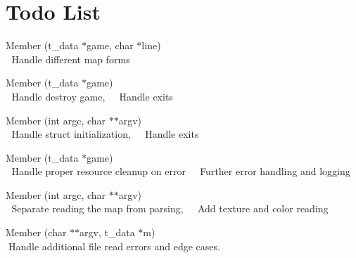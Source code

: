 \chapter{Todo List}
\hypertarget{todo}{}\label{todo}

\begin{DoxyRefList}
\item[Member \doxylink{read__map_8c_a804cd515bd4c1bf7169adeb352db80fb}{add\+\_\+line} (t\+\_\+data \texorpdfstring{$\ast$}{*}game, char \texorpdfstring{$\ast$}{*}line)]\hfill \\
\label{todo__todo000004}%
%
👾 Handle different map forms  
\item[Member \doxylink{cub3d_8c_a935bbae1ea2cb5d18534db1274ec24dd}{exit\+\_\+point} (t\+\_\+data \texorpdfstring{$\ast$}{*}game)]\hfill \\
\label{todo__todo000001}%
%
👾 Handle destroy game,~\newline
 👾 Handle exits  
\item[Member \doxylink{cub3d_8c_a3c04138a5bfe5d72780bb7e82a18e627}{main} (int argc, char \texorpdfstring{$\ast$}{*}\texorpdfstring{$\ast$}{*}argv)]\hfill \\
\label{todo__todo000002}%
%
👾 Handle struct initialization,~\newline
 👾 Handle exits  
\item[Member \doxylink{mlx__init__create__win_8c_a81e5bd795cb879b651de99812ac575da}{mlx\+\_\+init\+\_\+create\+\_\+window} (t\+\_\+data \texorpdfstring{$\ast$}{*}game)]\hfill \\
\label{todo__todo000006}%
%
👾 Handle proper resource cleanup on error~\newline
 👾 Further error handling and logging  
\item[Member \doxylink{parsing_8c_a5a92095eb57b614020d1000c4cdc92d5}{parsing} (int argc, char \texorpdfstring{$\ast$}{*}\texorpdfstring{$\ast$}{*}argv)]\hfill \\
\label{todo__todo000003}%
%
👾 Separate reading the map from parsing,~\newline
 👾 Add texture and color reading


\item[Member \doxylink{read__map_8c_abc6a0e39f4097410a6462b03e8b98fe5}{read\+\_\+map} (char \texorpdfstring{$\ast$}{*}\texorpdfstring{$\ast$}{*}argv, t\+\_\+data \texorpdfstring{$\ast$}{*}m)]\hfill \\
\label{todo__todo000005}%
%
👾\+Handle additional file read errors and edge cases. 
\end{DoxyRefList}